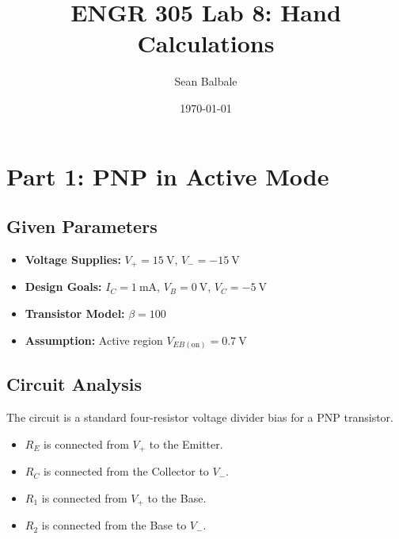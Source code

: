 \documentclass[11pt]{article}
\title{ENGR 305 Lab 8: Hand Calculations}
\author{Sean Balbale} %
\date{\today} %
\begin{document}
\maketitle
\thispagestyle{empty} %

\section{Part 1: PNP in Active Mode}

\subsection{Given Parameters}
\begin{itemize}
    \item \textbf{Voltage Supplies:} $V_{+} = \SI{15}{\volt}$, $V_{-} = \SI{-15}{\volt}$
    \item \textbf{Design Goals:} $I_{C} = \SI{1}{\milli\ampere}$, $V_{B} = \SI{0}{\volt}$, $V_{C} = \SI{-5}{\volt}$
    \item \textbf{Transistor Model:} $\beta = 100$
    \item \textbf{Assumption:} Active region $V_{EB(\text{on})} = \SI{0.7}{\volt}$
\end{itemize}

\subsection{Circuit Analysis}
The circuit is a standard four-resistor voltage divider bias for a PNP transistor.
\begin{itemize}
    \item $R_E$ is connected from $V_+$ to the Emitter.
    \item $R_C$ is connected from the Collector to $V_-$.
    \item $R_1$ is connected from $V_+$ to the Base.
    \item $R_2$ is connected from the Base to $V_-$.
\end{itemize}
\end{document}

